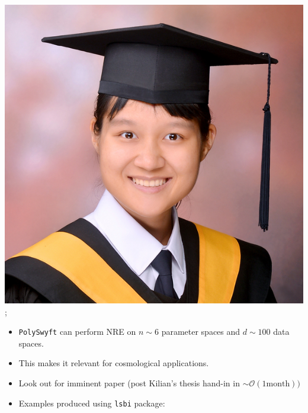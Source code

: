 \documentclass[aspectratio=169]{beamer}
\begin{document}
\begin{frame}
{        \includegraphics[width=0.09\textheight]{figures/students/wei-ning_deng.jpg}%
    };
    \begin{itemize}
        \item \texttt{PolySwyft} can perform NRE on $n\sim 6$ parameter spaces and $d\sim100$ data spaces.
        \item This makes it relevant for cosmological applications.
        \item Look out for imminent paper (post Kilian's thesis hand-in in $\sim\mathcal{O}(1 \text{month}))$
        \item Examples produced using \texttt{lsbi} package: \\
    \end{itemize}
\end{frame}
\end{document}
